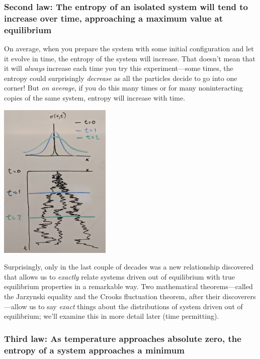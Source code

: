 \documentclass[english,course]{lecture}
\begin{document}
\subsubsection{Second law: The entropy of an isolated system will tend to increase over time, approaching a maximum value at equilibrium}

On average, when you prepare the system with some initial configuration and let it evolve in time, the entropy of the system will increase.
That doesn't mean that it will \emph{always} increase each time you try this experiment---some times, the entropy could surprisingly \emph{decrease} as all the particles decide to go into one corner!
But \emph{on average}, if you do this many times or for many noninteracting copies of the same system, entropy will increase with time.

\begin{centering}
\includegraphics[width=0.4\textwidth]{figures/diffusing-1d-particle.jpg}

\end{centering}

Surprisingly, only in the last couple of decades was a new relationship discovered that allows us to \emph{exactly} relate systems driven out of equilibrium with true equilibrium properties in a remarkable way.
Two mathematical theorems---called the Jarzynski equality and the Crooks fluctuation theorem, after their discoverers---allow us to say \emph{exact} things about the distributions of system driven out of equilibrium; we'll examine this in more detail later (time permitting).

\subsubsection{Third law: As temperature approaches absolute zero, the entropy of a system approaches a minimum}
\end{document}
